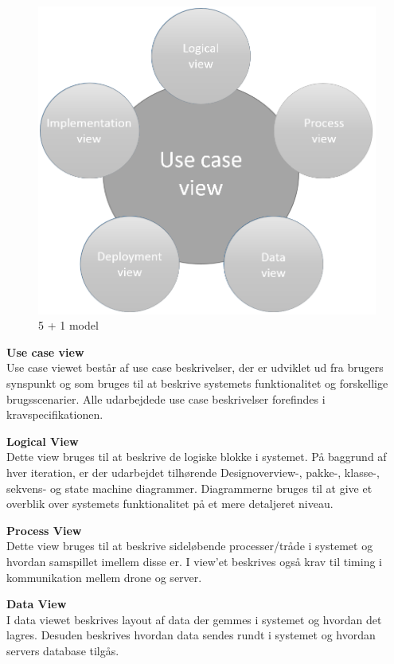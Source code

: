 \begin{figure}[H]
	\centering
	\includegraphics[width=1\textwidth]{Billeder/Udviklingsproces/n+1}
	\caption{5 + 1 model}
	\label{fig:n+1}
\end{figure}

\newpage


\textbf{Use case view}\\
Use case viewet består af use case beskrivelser, der er udviklet ud fra brugers synspunkt og som bruges til at beskrive systemets funktionalitet og forskellige brugsscenarier. Alle udarbejdede use case beskrivelser forefindes i kravspecifikationen.

\textbf{Logical View}\\
Dette view bruges til at beskrive de logiske blokke i systemet. På baggrund af hver iteration, er der udarbejdet tilhørende Designoverview-, pakke-, klasse-, sekvens- og state machine diagrammer. Diagrammerne bruges til at give et overblik over systemets funktionalitet på et mere detaljeret niveau.

\textbf{Process View}\\
Dette view bruges til at beskrive sideløbende processer/tråde i systemet og hvordan samspillet imellem disse er. I view'et beskrives også krav til timing i kommunikation mellem drone og server.

\textbf{Data View}\\
I data viewet beskrives layout af data der gemmes i systemet og hvordan det lagres. Desuden beskrives hvordan data sendes rundt i systemet og hvordan servers database tilgås.


